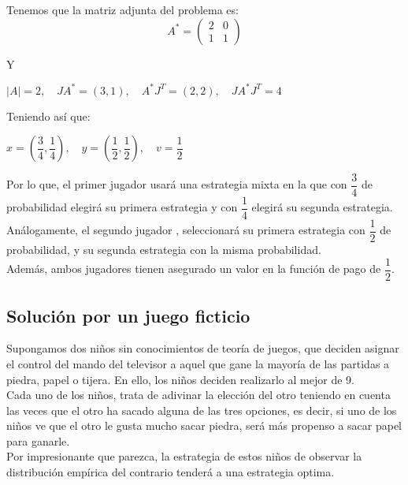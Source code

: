 \documentclass[10pt,a4paper]{book}
\begin{document}
Tenemos que la matriz adjunta del problema es:\\

\begin{equation}
A^{*}=\begin{pmatrix}
		2 & 0 \\
		1 & 1 
	\end{pmatrix}
\end{equation}

Y 
\begin{center}
$|A|=2,\quad  JA^{*}=(3,1), \quad A^{*}J^{T}=(2,2), \quad JA^{*}J^{T}=4$
\end{center}

Teniendo así que:\\

\begin{center}
$x=(\dfrac{3}{4},\dfrac{1}{4}), \quad y=(\dfrac{1}{2},\dfrac{1}{2}),\quad v=\dfrac{1}{2}
$
\end{center}


Por lo que, el primer jugador usará una estrategia mixta en la que con $\dfrac{3}{4}$ de probabilidad elegirá su primera estrategia y con $\dfrac{1}{4}$ elegirá su segunda estrategia. Análogamente, el segundo jugador , seleccionará su primera estrategia con $\dfrac{1}{2}$ de probabilidad, y su segunda estrategia con la misma probabilidad.\\
Además, ambos jugadores tienen asegurado un valor en la función de pago de $\dfrac{1}{2}$.\\



\subsection{Solución por un juego ficticio}
Supongamos dos niños sin conocimientos de teoría de juegos, que deciden asignar el control del mando del televisor a aquel que gane la mayoría de las partidas a piedra, papel o tijera. En ello, los niños deciden realizarlo al mejor de 9.\\
Cada uno de los niños, trata de adivinar la elección del otro teniendo en cuenta las veces que el otro ha sacado alguna de las tres opciones, es decir, si uno de los niños ve que el otro le gusta mucho sacar piedra, será más propenso a sacar papel para ganarle.\\
Por impresionante que parezca, la estrategia de estos niños de observar la distribución empírica del contrario tenderá a una estrategia optima.\\
\end{document}
